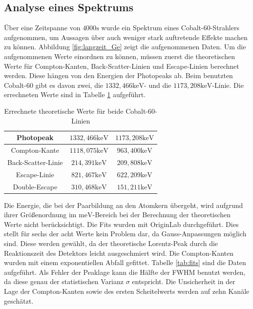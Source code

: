 \documentclass[
	parskip=half,10pt,
	numbers= noenddot, %
	toc=flat, %
	oneside,
	twocolumn,
	]{scrartcl}
\begin{document}
\subsection{Analyse eines Spektrums}

Über eine Zeitspanne von $4000 \si{\second}$ wurde ein Spektrum eines Cobalt-60-Strahlers aufgenommen, um Aussagen über auch weniger stark auftretende Effekte machen zu 
können. Abbildung \ref{fig:langzeit_Ge} zeigt die aufgenommenen Daten. Um die aufgenommenen Werte einordnen zu können, müssen zuerst die theoretischen Werte für 
Compton-Kanten, Back-Scatter-Linien und Escape-Linien berechnet 
werden. Diese hängen von den Energien der Photopeaks ab. Beim benutzten Cobalt-60 gibt es davon zwei, die $1332,466 \si{\kilo \electronvolt}$- und die 
$1173,208 \si{\kilo \electronvolt}$-Linie. Die errechneten Werte sind in Tabelle \ref{tab:theo} aufgeführt. 

\begin{table}
\begin{tabular}{ccc}
Photopeak & $1332,466 \si{\kilo \electronvolt}$ & $1173,208 \si{\kilo \electronvolt}$ \\
 \hline 
Compton-Kante & $1118,075 \si{\kilo \electronvolt}$ &  $963,400 \si{\kilo \electronvolt}$\\
Back-Scatter-Linie &  $214,391 \si{\kilo \electronvolt}$ &  $209,808 \si{\kilo \electronvolt}$ \\
Escape-Linie & $821,467 \si{\kilo \electronvolt}$ & $622,209 \si{\kilo \electronvolt}$ \\
Double-Escape & $310,468 \si{\kilo \electronvolt}$ & $151,211 \si{\kilo \electronvolt}$
\end{tabular}
\caption{Errechnete theoretische Werte für beide Cobalt-60-Linien}
\label{tab:theo}
\end{table}

Die Energie, die bei der Paarbildung an den Atomkern übergeht, wird aufgrund ihrer Größenordnung im $\si{\milli \electronvolt}$-Bereich bei der Berechnung der 
theoretischen Werte nicht berücksichtigt. Die Fits wurden mit OriginLab durchgeführt. Dies stellt für sechs der acht Werte kein Problem dar, da Gauss-Anpassungen 
möglich sind. Diese werden gewählt, da der theoretische Lorentz-Peak durch die Reaktionszeit des Detektors leicht ausgeschmiert wird. Die Compton-Kanten 
wurden mit einem exponentiellen Abfall gefittet. Tabelle \ref{tab:fits} sind die Daten aufgeführt. Als Fehler der Peaklage kann die Hälfte der FWHM benutzt werden, 
da diese genau der statistischen Varianz $\sigma$ entspricht. Die Unsicherheit in der Lage der Compton-Kanten sowie des ersten Scheitelwerts werden auf zehn Kanäle 
geschätzt. 
\end{document}

